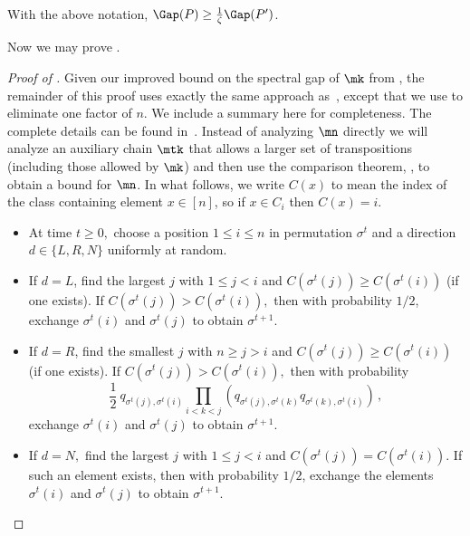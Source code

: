 \documentclass{toc}
\begin{document}
\begin{theorem}\label{thm_comp}
With the above notation, $\Gap(P)\geq \frac{1}{\zeta} \Gap(P')$.
\end{theorem}

Now we may prove .\\

%
\begin{proof}[Proof of ]
Given our improved bound on the spectral gap of $\mk$ from
, the remainder of this proof uses exactly the
same approach as~\cite{MS}, except that we use 
to eliminate one factor of $n$.  We include a summary here for
completeness.  The complete details can be found in~\cite{MS}.
Instead of analyzing $\mn$ directly we will analyze an auxiliary chain
$\mtk$ that allows a larger set of transpositions (including those
allowed by $\mk$) and then use the comparison theorem, ,
to obtain a bound for $\mn$.   
In what follows, we write $C(x)$ to mean the index of the class containing element $x\in [n]$, so if $x\in C_i$ then $C(x)=i$.

\vspace{.1in}

\vspace{.05in}
\begin{itemize}
\item At time $t\geq0,$ choose a position $1\leq i \leq n$ in permutation $\sigma^t$ and a direction $d \in \{L, R,N\}$ uniformly at random.  
\item If $d = L$, find the largest $j$ with $1 \leq j<i$ and $C(\sigma^t(j)) \geq C(\sigma^t(i))$ (if one exists).  If $C(\sigma^t(j)) > C(\sigma^t(i)),$ then 
with probability $1/2$,
exchange $\sigma^t(i)$ and $\sigma^t(j)$ to obtain $\sigma^{t+1}.$  
\item If $d = R$, find the smallest $j$ with $n\geq j>i$ and $C(\sigma^t(j)) \geq C(\sigma^t(i))$ (if one exists).  If $C(\sigma^t(j)) > C(\sigma^t(i)),$ then with probability 
$$\frac{1}{2}~ q_{\sigma^t(j),\sigma^t(i)}  \prod_{i<k<j}\left(q_{\sigma^t(j),\sigma^t(k)}q_{\sigma^t(k),\sigma^t(i)}\right)\,,$$
exchange $\sigma^t(i)$ and $\sigma^t(j)$ to obtain $\sigma^{t+1}.$  
\item If $d = N,$  find the largest $j$ with $1\leq j<i$ and $C(\sigma^t(j)) = C(\sigma^t(i)).$  If such an element exists, then with probability $1/2$, exchange the elements $\sigma^t(i)$ and $\sigma^t(j)$ to obtain $\sigma^{t+1}.$ 


\end{itemize}
\end{proof}
\end{document}
